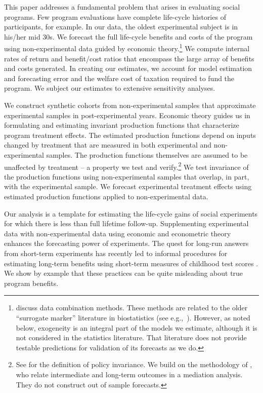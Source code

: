 This paper addresses a fundamental problem that arises in evaluating social programs. Few program evaluations have complete life-cycle histories of participants, for example. In our data, the oldest experimental subject is in his/her mid 30s. We forecast the full life-cycle benefits and costs of the program using non-experimental data guided by economic theory.\footnote{\citet{Ridder_Moffitt_2007_hbk_metricsdata} discuss data combination methods. These methods are related to the older ``surrogate marker'' literature in biostatistics (see e.g.,\ \citealp{Prentice_1989_Surrogate_SiM}). However, as noted below, exogeneity is an integral part of the models we estimate, although it is not considered in the statistics literature. That literature does not provide testable predictions for validation of its forecasts as we do.} We compute internal rates of return and benefit/cost ratios that encompass the large array of benefits and costs generated. In creating our estimates, we account for model estimation and forecasting error and the welfare cost of taxation required to fund the program. We subject our estimates to extensive sensitivity analyses.

We construct synthetic cohorts from non-experimental samples that approximate experimental samples in post-experimental years. Economic theory guides us in formulating and estimating invariant production functions that characterize program treatment effects. The estimated production functions depend on inputs changed by treatment that are measured in both experimental and non-experimental samples. The production functions themselves are assumed to be unaffected by treatment -- a property we test and verify.\footnote{See \cite{Hurwicz_1962_structural} for the definition of policy invariance. We build on the methodology of \citet{Heckman_Pinto_etal_2013_PerryFactor}, who relate intermediate and long-term outcomes in a mediation analysis. They do not construct out of sample forecasts.} We test invariance of the production functions using non-experimental samples that overlap, in part, with the experimental sample. We forecast experimental treatment effects using estimated production functions applied to non-experimental data.

Our analysis is a template for estimating the life-cycle gains of social experiments for which there is less than full lifetime follow-up. Supplementing experimental data with non-experimental data using economic and econometric theory enhances the forecasting power of experiments. The quest for long-run answers from short-term experiments has recently led to informal procedures for estimating long-term benefits using short-term measures of childhood test scores \citep[e.g.][]{Chetty_Friedman_etal_2011_QJoE,Kline_Walters_2016_QJE}. We show by example that these practices can be quite misleading about true program benefits.

